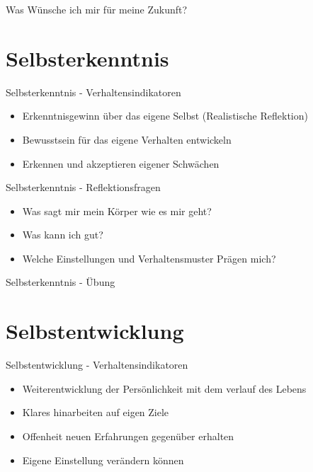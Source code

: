 \begin{frame}[standout]
    Was Wünsche ich mir für meine Zukunft?
\end{frame}





\section{Selbsterkenntnis}

\begin{frame}[c]{Selbsterkenntnis - Verhaltensindikatoren}
    \begin{itemize}
    \item Erkenntnisgewinn über das eigene Selbst (Realistische Reflektion) \newline
    \pause
    \item Bewusstsein für das eigene Verhalten entwickeln \newline
    \pause
    \item Erkennen und akzeptieren eigener Schwächen \newline
    \end{itemize}
\end{frame}


\begin{frame}[c]{Selbsterkenntnis - Reflektionsfragen}
    \begin{itemize}
    \item Was sagt mir mein Körper wie es mir geht? \newline
    \pause
    \item Was kann ich gut? \newline
    \pause
    \item Welche Einstellungen und Verhaltensmuster Prägen mich?
    \end{itemize}
\end{frame}


\begin{frame}[c]{Selbsterkenntnis - Übung}
    
\end{frame}





\section{Selbstentwicklung}

\begin{frame}[c]{Selbstentwicklung - Verhaltensindikatoren}
    \begin{itemize}
    \item Weiterentwicklung der Persönlichkeit mit dem verlauf des Lebens
    \pause
    \item Klares hinarbeiten auf eigen Ziele
    \pause
    \item Offenheit neuen Erfahrungen gegenüber erhalten
    \pause
    \item Eigene Einstellung verändern können
    \end{itemize}
\end{frame}


